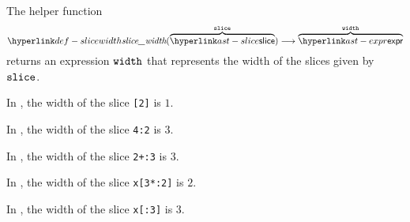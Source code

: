 \begin{mathpar}
\end{mathpar}

\hypertarget{def-slicewidth}{}
The helper function
\[
  \slicewidth(\overname{\slice}{\vslice}) \aslto
  \overname{\expr}{\vwidth}
\]
returns an expression $\vwidth$ that represents the width of the slices given by $\vslice$.

In ,
the width of the slice \texttt{[2]} is $1$.

In ,
the width of the slice \texttt{4:2} is $3$.

In ,
the width of the slice \texttt{2+:3} is $3$.

In ,
the width of the slice \texttt{x[3*:2]} is $2$.

In ,
the width of the slice \texttt{x[:3]} is $3$.

